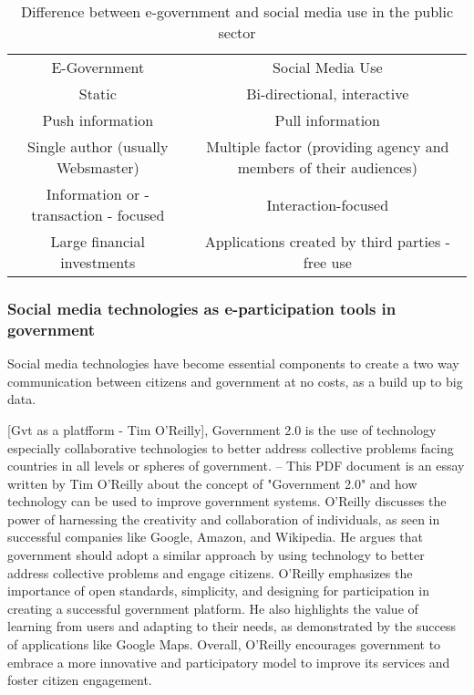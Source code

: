 \begin{table}
    \centering
    \begin{tabular}{cc}
        E-Government & Social Media Use \\
         Static & Bi-directional, interactive\\
         Push information & Pull information\\
         Single author (usually Websmaster) & Multiple factor (providing agency and members of their audiences) \\
         Information or - transaction - focused & Interaction-focused\\
         Large financial investments & Applications created by third parties - free use\\
    \end{tabular}
    \caption{Difference between e-government and social media use in the public sector}
    \label{tab:my_label}
\end{table}

\subsubsection{Social media technologies as e-participation tools in government}

Social media technologies have become essential components to create a two way communication between citizens and government at no costs, as a build up to big data.  

[Gvt as a platfform - Tim O'Reilly], Government 2.0 is the use of technology especially collaborative technologies to better address collective problems facing countries in all levels or spheres of government.  --  This PDF document is an essay written by Tim O'Reilly about the concept of "Government 2.0" and how technology can be used to improve government systems. O'Reilly discusses the power of harnessing the creativity and collaboration of individuals, as seen in successful companies like Google, Amazon, and Wikipedia. He argues that government should adopt a similar approach by using technology to better address collective problems and engage citizens. O'Reilly emphasizes the importance of open standards, simplicity, and designing for participation in creating a successful government platform. He also highlights the value of learning from users and adapting to their needs, as demonstrated by the success of applications like Google Maps. Overall, O'Reilly encourages government to embrace a more innovative and participatory model to improve its services and foster citizen engagement.

